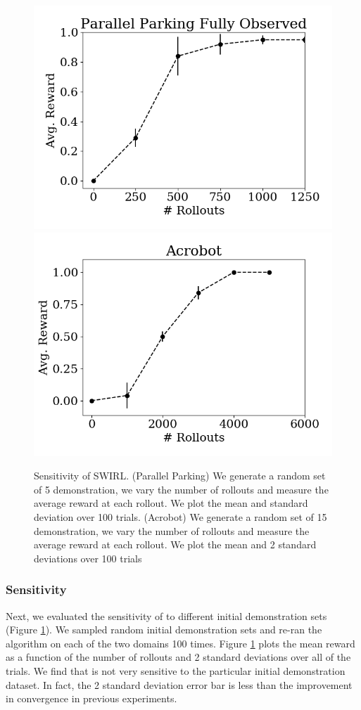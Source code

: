 \begin{figure}[t]
\centering
 \includegraphics[width=0.48\columnwidth]{swirl-experiments/ppfo-eb1.png}
 \includegraphics[width=0.48\columnwidth]{swirl-experiments/ppfo-eb2.png}
 \caption{Sensitivity of SWIRL. (Parallel Parking) We generate a random set of 5 demonstration, we vary the number of rollouts and measure the average reward at each rollout. We plot the mean and standard deviation over 100 trials.  (Acrobot) We generate a random set of 15 demonstration, we vary the number of rollouts and measure the average reward at each rollout. We plot the mean and 2 standard deviations over 100 trials \label{exp:eb}}
\end{figure}

\subsubsection{Sensitivity}
Next, we evaluated the sensitivity of \hirl to different initial demonstration sets (Figure \ref{exp:eb}). We sampled random initial demonstration sets and re-ran the algorithm on each of the two domains 100 times. Figure \ref{exp:eb} plots the mean reward as a function of the number of rollouts and 2 standard deviations over all of the trials. We find that \hirl is not very sensitive to the particular initial demonstration dataset. In fact, the 2 standard deviation error bar is less than the improvement in convergence in previous experiments.


